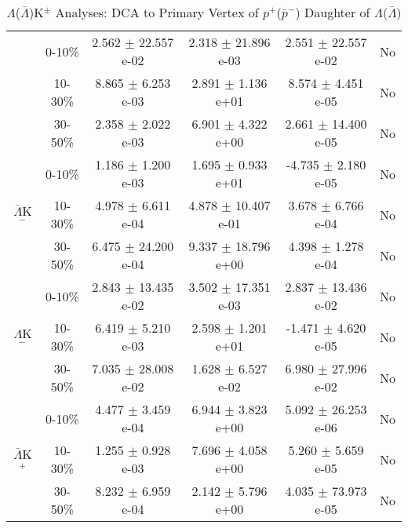 \documentclass[../AnalysisNoteJBuxton.tex]{subfiles}
\begin{document}
\begin{table}
\begin{tabular}{|c|c|c|c|c|c|}
   &  0-10\% & 2.562 $\pm$ 22.557 e-02 & 2.318 $\pm$ 21.896 e-03 & 2.551 $\pm$ 22.557 e-02 & No \\
   & 10-30\% & 8.865 $\pm$ 6.253 e-03 & 2.891 $\pm$ 1.136 e+01 & 8.574 $\pm$ 4.451 e-05 & No \\
   & 30-50\% & 2.358 $\pm$ 2.022 e-03 & 6.901 $\pm$ 4.322 e+00 & 2.661 $\pm$ 14.400 e-05 & No \\
  \hline  
  \multirow{3}{*}{$\bar{\Lambda}$K$^{-}$}
   & 0-10\% & 1.186 $\pm$ 1.200 e-03 & 1.695 $\pm$ 0.933 e+01 & -4.735 $\pm$ 2.180 e-05 & No \\
   & 10-30\% & 4.978 $\pm$ 6.611 e-04 & 4.878 $\pm$ 10.407 e-01 & 3.678 $\pm$ 6.766 e-04 & No \\
   & 30-50\% & 6.475 $\pm$ 24.200 e-04 & 9.337 $\pm$ 18.796 e+00 & 4.398 $\pm$ 1.278 e-04 & No \\
  \hline \hline
  \multirow{3}{*}{$\Lambda$K$^{-}$}   
   &  0-10\% & 2.843 $\pm$ 13.435 e-02 & 3.502 $\pm$ 17.351 e-03 & 2.837 $\pm$ 13.436 e-02 & No \\
   & 10-30\% & 6.419 $\pm$ 5.210 e-03 & 2.598 $\pm$ 1.201 e+01 & -1.471 $\pm$ 4.620 e-05 & No \\
   & 30-50\% & 7.035 $\pm$ 28.008 e-02 & 1.628 $\pm$ 6.527 e-02 & 6.980 $\pm$ 27.996 e-02 & No \\
  \hline  
  \multirow{3}{*}{$\bar{\Lambda}$K$^{+}$}
   & 0-10\% & 4.477 $\pm$ 3.459 e-04 & 6.944 $\pm$ 3.823 e+00 & 5.092 $\pm$ 26.253 e-06 & No \\
   & 10-30\% & 1.255 $\pm$ 0.928 e-03 & 7.696 $\pm$ 4.058 e+00 & 5.260 $\pm$ 5.659 e-05 & No \\
   & 30-50\% & 8.232 $\pm$ 6.959 e-04 & 2.142 $\pm$ 5.796 e+00 & 4.035 $\pm$ 73.973 e-05 & No \\  
  \hline
 \end{tabular}
 \caption{$\Lambda$($\bar{\Lambda}$)K$^{\pm}$ Analyses: DCA to Primary Vertex of $p^{+}$($\bar{p}^{-}$) Daughter of $\Lambda$($\bar{\Lambda}$)}
 \label{tab:DcaToPrimVertexProtonDaughtOfLamLamKchFull}
\end{table}
\end{document}
